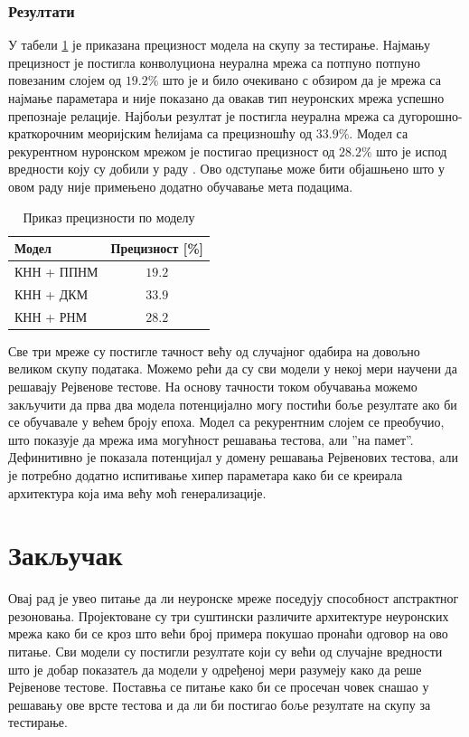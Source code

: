 \documentclass[a4paper, 12pt, master, utf8]{etf}
\begin{document}
\subsection{Резултати}

У табели \ref{tab:pr} је приказана прецизност модела на скупу за тестирање. 
Најмању прецизност је постигла конволуциона неурална мрежа са потпуно потпуно повезаним слојем од $19.2 \%$ што је и било очекивано с обзиром 
да је мрежа са најмање параметара и није показано да овакав тип неуронских мрежа успешно препознаје релације.
Најбољи резултат је постигла неурална мрежа са дугорошно-краткорочним меоријским ћелијама са прецизношћу од $33.9 \%$. 
Модел са рекурентном нуронском мрежом је постигао прецизност од $28.2 \%$ што је испод вредности коју су добили у раду \cite{barrett_measuring_2018}.
Ово одступање може бити објашњено што у овом раду није примењено додатно обучавање мета подацима.
\newline

\begin{table}[h]
    \centering
    \begin{tabular}{l | c}
    \hline
    Модел & Прецизност [\%]\\
    \hline
        КНН + ППНМ &$ 19.2$\\
        КНН + ДКМ & $ 33.9$\\
        КНН + РНМ & $28.2 $\\
    \end{tabular}
    \caption{Приказ прецизности по моделу}
    \label{tab:pr}
\end{table}

Све три мреже су постигле тачност већу од случајног одабира на довољно великом скупу података. Можемо рећи да су сви модели у некој мери научени да решавају Рејвенове тестове.
На основу тачности током обучавања можемо закључити да прва два модела потенцијално могу постићи боље резултате ако би се обучавале у већем броју епоха.
Модел са рекурентним слојем се преобучио, што показује да мрежа има могућност решавања тестова, али ”на памет”. Дефинитивно је показала потенцијал у домену решавања Рејвенових тестова, али 
је потребно додатно испитивање хипер параметара како би се креирала архитектура која има већу моћ генерализације.

\chapter{Закључак }
\label{sec:6}

Овај рад је увео питање да ли неуронске мреже поседују способност апстрактног резоновања. Пројектоване су три суштински различите архитектуре неуронских мрежа како би се кроз што већи број
примера покушао пронаћи одговор на ово питање. Сви модели су постигли резултате који су већи од случајне вредности што је добар показатељ да модели у одређеној мери разумеју како да реше Рејвенове тестове.
Поставња се питање како би се просечан човек снашао у решавању ове врсте тестова и да ли би постигао боље резултате на скупу за тестирање. 
\newline
\end{document}
